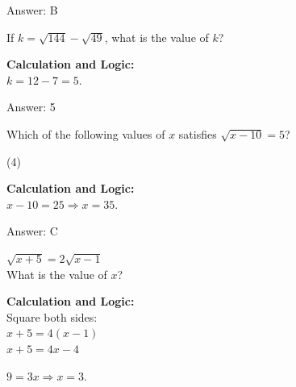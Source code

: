 \documentclass[11pt,paper=a4,answers]{exam}
\begin{document}
\begin{questions}
\begin{solution}
\vspace{25pt}

Answer: \colorbox{yellow!100}{B}
\end{solution}

\vspace{40pt}

\question
If $k = \sqrt{144} - \sqrt{49}$, what is the value of $k$?

\begin{solution}
\textbf{Calculation and Logic:} \\
$k = 12 - 7 = 5$.

\vspace{25pt}

Answer: \colorbox{yellow!100}{5}
\end{solution}

\vspace{40pt}

\question
Which of the following values of $x$ satisfies $\sqrt{x - 10} = 5$?
\begin{tasks}(4)
\end{tasks}

\begin{solution}
\textbf{Calculation and Logic:} \\
$x - 10 = 25 \Rightarrow x = 35$.

\vspace{25pt}

Answer: \colorbox{yellow!100}{C}
\end{solution}

\vspace{40pt}

\question
$\sqrt{x + 5} = 2\sqrt{x - 1}$ \\
What is the value of $x$?

\begin{solution}
\textbf{Calculation and Logic:} \\
Square both sides: \\
$x + 5 = 4(x - 1)$ \\
$x + 5 = 4x - 4$

\vspace{10pt}

$9 = 3x \Rightarrow x = 3$.


\end{solution}
\end{questions}
\end{document}
